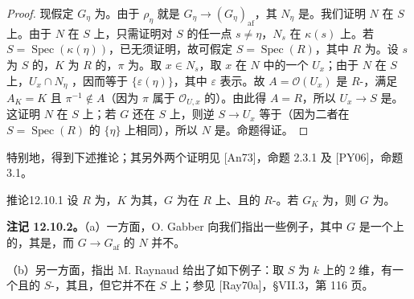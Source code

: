 \begin{proof}
现假定 $G_\eta$ 为。由于 $\rho_\eta$ 就是 $G_\eta\to(G_\eta)_{\mathrm{af}}$，其 $N_\eta$ 是。我们证明 $N$ 在 $S$ 上。由于 $N$ 在 $S$ 上，只需证明对 $S$ 的任一点 $s\ne\eta$，$N_s$ 在 $\kappa(s)$ 上。若 $S=\operatorname{Spec}(\kappa(\eta))$，已无须证明，故可假定 $S=\operatorname{Spec}(R)$，其中 $R$ 为。设 $s$ 为 $S$ 的，$K$ 为 $R$ 的，$\pi$ 为。取 $x\in N_s$，取 $x$ 在 $N$ 中的一个 $U_x$；由于 $N$ 在 $S$ 上，$U_x\cap N_\eta$ ，因而等于 $\{\varepsilon(\eta)\}$，其中 $\varepsilon$ 表示。故 $A=\mathcal O(U_x)$ 是 $R$-，满足 $A_K=K$ 且 $\pi^{-1}\notin A$（因为 $\pi$ 属于 $\mathcal O_{U,x}$ 的）。由此得 $A=R$，所以 $U_x\to S$ 是。这证明 $N$ 在 $S$ 上；若 $G$ 还在 $S$ 上，则逆 $S\to U_x$ 等于（因为二者在 $S=\operatorname{Spec}(R)$ 的 $\{\eta\}$ 上相同），所以 $N$ 是。命题得证。
\end{proof}

特别地，得到下述推论；其另外两个证明见 [An73]，命题 2.3.1 及 [PY06]，命题 3.1。

\begin{SGAresult}{推论}{12.10.1}
设 $R$ 为，$K$ 为其，$G$ 为在 $R$ 上、且的 $R$-。若 $G_K$ 为，则 $G$ 为。
\end{SGAresult}

\textbf{注记 12.10.2。}（a）一方面，O. Gabber 向我们指出一些例子，其中 $G$ 是一个上的，其是，而 $G\to G_{\mathrm{af}}$ 的 $N$ 并不。

（b）另一方面，指出 M. Raynaud 给出了如下例子：取 $S$ 为 $k$ 上的 $2$ 维，有一个且的 $S$-，其且，但它并不在 $S$ 上；参见 [Ray70a]，§VII.3，第 116 页。

